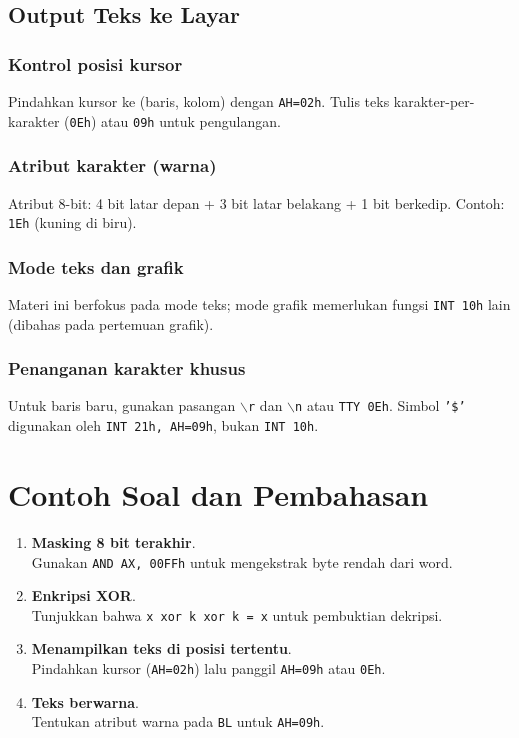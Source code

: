 \subsection{Output Teks ke Layar}
\subsubsection{Kontrol posisi kursor}
Pindahkan kursor ke (baris, kolom) dengan \texttt{AH=02h}. Tulis teks karakter-per-karakter (\texttt{0Eh}) atau \texttt{09h} untuk pengulangan.

\subsubsection{Atribut karakter (warna)}
Atribut 8-bit: 4 bit latar depan + 3 bit latar belakang + 1 bit berkedip. Contoh: \texttt{1Eh} (kuning di biru).

\subsubsection{Mode teks dan grafik}
Materi ini berfokus pada mode teks; mode grafik memerlukan fungsi \texttt{INT 10h} lain (dibahas pada pertemuan grafik).

\subsubsection{Penanganan karakter khusus}
Untuk baris baru, gunakan pasangan \texttt{$\backslash$r} dan \texttt{$\backslash$n} atau \texttt{TTY 0Eh}. Simbol \texttt{'\$'} digunakan oleh \texttt{INT 21h, AH=09h}, bukan \texttt{INT 10h}.

\section{Contoh Soal dan Pembahasan}
\begin{enumerate}
  \item \textbf{Masking 8 bit terakhir}.\\ Gunakan \texttt{AND AX, 00FFh} untuk mengekstrak byte rendah dari word.
  \item \textbf{Enkripsi XOR}.\\ Tunjukkan bahwa \texttt{x xor k xor k = x} untuk pembuktian dekripsi.
  \item \textbf{Menampilkan teks di posisi tertentu}.\\ Pindahkan kursor (\texttt{AH=02h}) lalu panggil \texttt{AH=09h} atau \texttt{0Eh}.
  \item \textbf{Teks berwarna}.\\ Tentukan atribut warna pada \texttt{BL} untuk \texttt{AH=09h}.
\end{enumerate}

